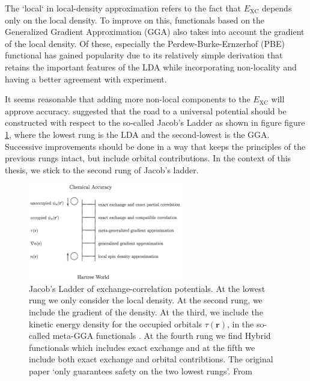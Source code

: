 The `local` in local-density approximation refers to the fact that $E_\text{XC}$ depends only on the local density. To improve on this, functionals based on the Generalized Gradient Approximation (GGA) also takes into account the gradient of the local density. Of these, especially the Perdew-Burke-Ernzerhof (PBE) functional has gained popularity due to its relatively simple derivation that retains the important features of the LDA while incorporating non-locality and having a better agreement with experiment.

It seems reasonable that adding more non-local components to the $E_\text{XC}$ will approve accuracy. \citeauthor{Perdew2001} suggested that the road to a universal potential should be constructed with respect to the so-called Jacob's Ladder \cite{Perdew2001} as shown in figure figure \ref{fig:jacobs_ladder}, where the lowest rung is the LDA and the second-lowest is the GGA. Successive improvements should be done in a way that keeps the principles of the previous rungs intact, but include orbital contributions. In the context of this thesis, we stick to the second rung of Jacob's ladder.

\begin{figure}
	\centering
	\includegraphics[width=0.6\textwidth]{fig/method/dft/jacobs_ladder.png}
	\caption{Jacob's Ladder of exchange-correlation potentials. At the lowest rung we only consider the local density. At the second rung, we include the gradient of the density. At the third, we include the kinetic energy density for the occupied orbitals $\tau (\bm{r})$, in the so-called meta-GGA functionals \cite{Tao2003}. At the fourth rung we find  Hybrid functionals which includes exact exchange and at the fifth we include both exact exchange and orbital contribtions. The original paper \cite{Perdew2001} `only guarantees safety on the two lowest rungs'. From \cite{Perdew2001}}
	\label{fig:jacobs_ladder}
\end{figure}

